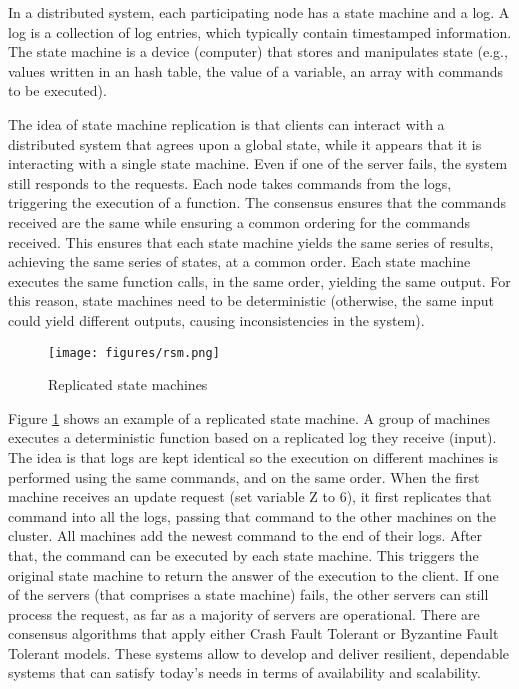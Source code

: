 \documentclass[12pt,a4paper]{article}
\begin{document}
In a distributed system, each participating node has a state machine and a log. A log is a collection of log entries, which typically contain timestamped information. The state machine is a device (computer) that stores and manipulates state (e.g., values written in an hash table, the value of a variable, an array with commands to be executed). 

The idea of state machine replication is that clients can interact with a distributed system that agrees upon a global state, while it appears that it is interacting with a single state machine. Even if one of the server fails, the system still responds to the requests. Each node takes commands from the logs, triggering the execution of a function. The consensus ensures that the commands received are the same while ensuring a common ordering for the commands received. This ensures that each state machine yields the same series of results, achieving the same series of states, at a common order. Each state machine executes the same function calls, in the same order, yielding the same output. For this reason, state machines need to be deterministic (otherwise, the same input could yield different outputs, causing inconsistencies in the system).
 
 \begin{figure}[h!]
    \centering
    \texttt{[image: figures/rsm.png]}
    \caption{Replicated state machines \cite{replicated}}
    \label{fig:rms}
\end{figure}

Figure \ref{fig:rms} shows an example of a replicated state machine. A group of machines executes a deterministic function based on a replicated log they receive (input). The idea is that logs are kept identical so the execution on different machines is performed using the same commands, and on the same order. When the first machine receives an update request (set variable Z to 6), it first replicates that command into all the logs, passing that command to the other machines on the cluster. All machines add the newest command to the end of their logs. After that, the command can be executed by each state machine. This triggers the original state machine to return the answer of the execution to the client. If one of the servers (that comprises a state machine) fails, the other servers can still process the request, as far as a majority of servers are operational. There are consensus algorithms that apply either Crash Fault Tolerant or Byzantine Fault Tolerant models. These systems allow to develop and deliver resilient, dependable systems that can satisfy today's needs in terms of availability and scalability.
\end{document}
